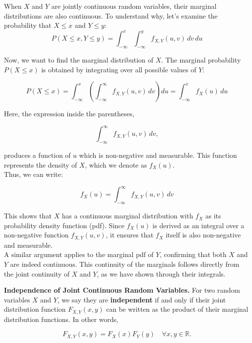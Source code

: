 \begin{lemma}
    When \( X \) and \( Y \) are jointly continuous random variables, their marginal distributions are also continuous. To understand why, let’s examine the probability that \( X \leq x \) and \( Y \leq y \):
\[
P(X \leq x, Y \leq y) = \int_{-\infty}^{x} \int_{-\infty}^{y} f_{X,Y}(u, v) \, dv \, du
\]
\end{lemma}


Now, we want to find the marginal distribution of \( X \). The marginal probability \( P(X \leq x) \) is obtained by integrating over all possible values of \( Y \):

\[
P(X \leq x) = \int_{-\infty}^{x} \left( \int_{-\infty}^{\infty} f_{X,Y}(u, v) \, dv \right) du = \int_{-\infty}^{x} f_X(u) \, du
\]

Here, the expression inside the parentheses,

\[
\int_{-\infty}^{\infty} f_{X,Y}(u, v) \, dv,
\]

produces a function of \( u \) which is non-negative and measurable. This function represents the density of \( X \), which we denote as \( f_X(u) \). \\

Thus, we can write:

\[
f_X(u) = \int_{-\infty}^{\infty} f_{X,Y}(u, v) \, dv
\]

This shows that \( X \) has a continuous marginal distribution with \( f_X \) as its probability density function (pdf). Since \( f_X(u) \) is derived as an integral over a non-negative function \( f_{X,Y}(u, v) \), it ensures that \( f_X \) itself is also non-negative and measurable.\\

A similar argument applies to the marginal pdf of \( Y \), confirming that both \( X \) and \( Y \) are indeed continuous. This continuity of the marginals follows directly from the joint continuity of \( X \) and \( Y \), as we have shown through their integrals.

\begin{definition}
    \textbf{Independence of Joint Continuous Random Variables.} For two random variables \( X \) and \( Y \), we say they are \textbf{independent} if and only if their joint distribution function \( F_{X,Y}(x, y) \) can be written as the product of their marginal distribution functions. In other words, 

    \[
    F_{X,Y}(x, y) = F_X(x) F_Y(y) \quad \forall x, y \in \mathbb{R}.
    \]
\end{definition}

